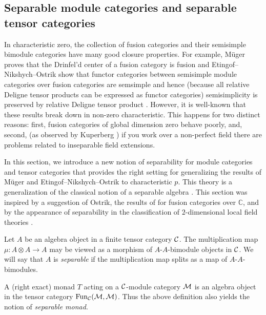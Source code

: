 \documentclass{amsart}
\begin{document}
\subsection{Separable module categories and separable tensor categories} \label{sec:tc-separable}
In characteristic zero, the collection of fusion categories and their semisimple bimodule categories have many good closure properties.  For example, M\"uger proves that the Drinfel'd center  of a fusion category is fusion \cite[Theorem 3.16]{MR1966525} and Etingof--Nikshych--Ostrik show that functor categories between semisimple module categories over fusion categories are semsimple and hence (because all relative Deligne tensor products can be expressed as functor categories) semisimplicity is preserved by relative Deligne tensor product \cite[Theorem 2.16]{MR2183279}.  However, it is well-known that these results break down in non-zero characteristic.  This happens for two distinct reasons: first, fusion categories of global dimension zero behave poorly, and, second, (as observed by Kuperberg \cite[Question 5.1]{MR1995781}) if you work over a non-perfect field there are problems related to inseparable field extensions.

In this section, we introduce a new notion of separability for module categories and tensor categories that provides the right setting for generalizing the results of M\"uger and Etingof--Nikshych--Ostrik to characteristic $p$.  This theory is a generalization of the classical notion of a separable algebra \cite{???}.   This section was inspired by a suggestion of Ostrik, the results of \cite[\S 2.4]{1009.2117} for fusion categories over $\mathbb{C}$, and by the appearance of separability in the classification of $2$-dimensional local field theories \cite{schommer-pries-thesis}.

\begin{definition}
	Let $A$ be an algebra object in a finite tensor category $\mathcal C$. The multiplication map $\mu: A \otimes A \to A$ may be viewed as a morphism of $A$-$A$-bimodule objects in $\mathcal C$. We will say that $A$ is {\em separable} if the multiplication map splits as a map of $A$-$A$-bimodules. 
\end{definition}

\begin{remark}
	A (right exact) monad $T$ acting on a $\mathcal C$-module category $\mathcal M$ is an algebra object in the tensor category $\operatorname{Fun}_\mathcal C(\mathcal M, \mathcal M)$. Thus the above definition also yields the notion of {\em separable monad}. 
\end{remark}
\end{document}
